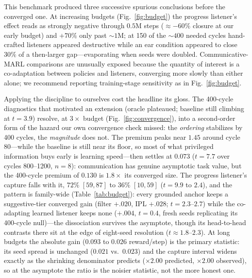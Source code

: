 \documentclass[sigconf,review,anonymous]{acmart}
\begin{document}
This benchmark produced three successive spurious conclusions before the converged one. At increasing budgets (Fig.~\ref{fig:budget}) the progress listener's effect reads as strongly negative through $0.5$M steps ($\approx{-}60\%$ closure at our early budget) and $+70\%$ only past ${\sim}1$M; at 150 of the ${\sim}400$ needed cycles hand-crafted listeners appeared destructive while an ear condition appeared to close $30\%$ of a then-larger gap---evaporating when seeds were doubled. Communicative-MARL comparisons are unusually exposed because the quantity of interest is a co-adaptation between policies and listeners, converging more slowly than either alone; we recommend reporting training-stage sensitivity as in Fig.~\ref{fig:budget}.

Applying the discipline to ourselves cost the headline its gloss. The 400-cycle diagnostics that motivated an extension (oracle plateaued; baseline still climbing at $t{=}3.9$) resolve, at $3\times$ budget (Fig.~\ref{fig:convergence}), into a second-order form of the hazard our own convergence check missed: the \emph{ordering} stabilizes by 400 cycles, the \emph{magnitude} does not. The premium peaks near $1.45$ around cycle 80---while the baseline is still near its floor, so most of what privileged information buys early is learning speed---then settles at $0.073$ ($t{=}7.7$ over cycles 800--1200, $n{=}8$): communication has genuine asymptotic task value, but the 400-cycle premium of $0.130$ is $1.8\times$ its converged size. The progress listener's capture falls with it, $72\%$ $[59,87]$ to $36\%$ $[10,59]$ ($t{=}9.9$ to $2.4$), and the pattern is family-wide (Table~\ref{tab:budget}): every grounded anchor keeps a suggestive-tier converged gain (filter $+.020$, IPL $+.028$; $t{=}2.3$--$2.7$) while the co-adapting learned listener keeps none ($+.004$, $t{=}0.4$, fresh seeds replicating its 400-cycle null)---the dissociation survives the asymptote, though its head-to-head contrasts there sit at the edge of eight-seed resolution ($t{\approx}1.8$--$2.3$). At long budgets the absolute gain ($0.093$ to $0.026$ reward/step) is the primary statistic: its seed spread is unchanged ($0.021$ vs.\ $0.023$) and the capture interval widens exactly as the shrinking denominator predicts ($\times2.00$ predicted, $\times2.00$ observed), so at the asymptote the ratio is the noisier statistic, not the more honest one.
\end{document}
